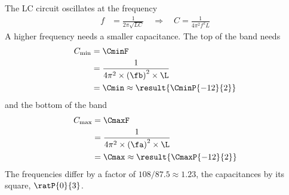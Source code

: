 The LC circuit oscillates at the frequency
\begin{align}
 f &= \frac{1}{2\pi\sqrt{L C}} \quad\Longrightarrow\quad C = \frac{1}{4\pi^2 f^2 L}
\end{align}
A higher frequency needs a smaller capacitance. The top of the band needs
\begin{align}
 C_\text{min} &= \CminF \\
   &= \frac{1}{4\pi^2\times\left(\fb\right)^2\times\L} \\
   &= \Cmin \approx \result{\CminP{-12}{2}}
\end{align}
and the bottom of the band
\begin{align}
 C_\text{max} &= \CmaxF \\
   &= \frac{1}{4\pi^2\times\left(\fa\right)^2\times\L} \\
   &= \Cmax \approx \result{\CmaxP{-12}{2}}
\end{align}
The frequencies differ by a factor of $108/87.5 \approx 1.23$, the capacitances by its square, $\ratP{0}{3}$.
